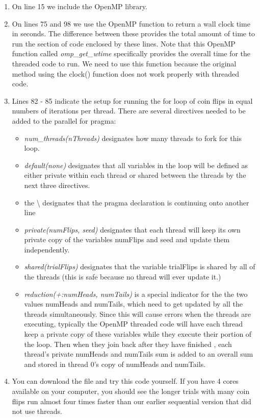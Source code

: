 \documentclass[letterpaper,10pt,openany,oneside]{sphinxmanual}
\begin{document}
\label{Threads/OpenMP_CoinFlip:some-notes-about-this-code}\begin{enumerate}
\item {} 
On line 15 we include the OpenMP library.

\item {} 
On lines 75 and 98 we use the OpenMP function to return a wall clock time in seconds.  The difference between these provides the total amount of time to run the section of code enclosed by these lines.  Note that this OpenMP function called \emph{omp\_get\_wtime} specifically provides the overall time for the threaded code to run.  We need to use this function because the original method using the clock() function does not work properly with threaded code.

\item {} 
Lines 82 - 85 indicate the setup for running the for loop of coin flips in equal numbers of iterations per thread. There are several directives needed to be added to the parallel for pragma:
\begin{itemize}
\item {} 
\emph{num\_threads(nThreads)} designates how many threads to fork for this loop.

\item {} 
\emph{default(none)} designates that all variables in the loop will be defined as either private within each thread or shared between the threads by the next three directives.

\item {} 
the \textbackslash{} designates that the pragma declaration is continuing onto another line

\item {} 
\emph{private(numFlips, seed)} designates that each thread will keep its own private copy of the variables numFlips and seed and update them independently.

\item {} 
\emph{shared(trialFlips)} designates that the variable trialFlips is shared by all of the threads (this is safe because no thread will ever update it.)

\item {} 
\emph{reduction(+:numHeads, numTails)} is a special indicator for the the two values numHeads and numTails, which need to get updated by all the threads simultaneously.  Since this will cause errors when the threads are executing, typically the OpenMP threaded code will have each thread keep a private copy of these variables while they execute their portion of the loop.  Then when they join back after they have finished , each thread's private numHeads and numTails sum is added to an overall sum and stored in thread 0's copy of numHeads and numTails.

\end{itemize}

\item {} 
You can download the file  and try this code  yourself.  If you have 4 cores available on your computer, you should see the longer trials with many coin flips run almost four times faster than our earlier sequential version that did not use threads.

\end{enumerate}
\end{document}
